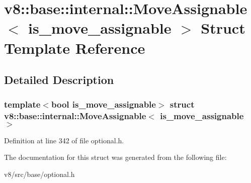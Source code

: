 \hypertarget{structv8_1_1base_1_1internal_1_1MoveAssignable}{}\section{v8\+:\+:base\+:\+:internal\+:\+:Move\+Assignable$<$ is\+\_\+move\+\_\+assignable $>$ Struct Template Reference}
\label{structv8_1_1base_1_1internal_1_1MoveAssignable}


\subsection{Detailed Description}
\subsubsection*{template$<$bool is\+\_\+move\+\_\+assignable$>$\newline
struct v8\+::base\+::internal\+::\+Move\+Assignable$<$ is\+\_\+move\+\_\+assignable $>$}



Definition at line 342 of file optional.\+h.



The documentation for this struct was generated from the following file\+:\begin{DoxyCompactItemize}
\item 
v8/src/base/optional.\+h\end{DoxyCompactItemize}
